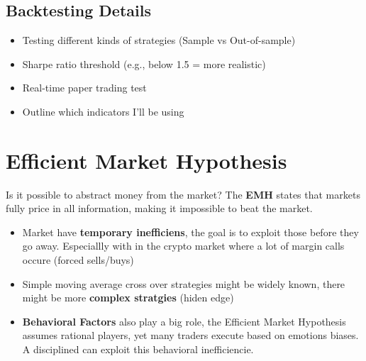 \documentclass[9pt,a4paper,twocolumn,twoside]{tau-class/tau}
\begin{document}
\subsection{Backtesting Details}
\begin{itemize}
  \item Testing different kinds of strategies (Sample vs Out-of-sample)
  \item Sharpe ratio threshold (e.g., below 1.5 = more realistic)
  \item Real-time paper trading test
  \item Outline which indicators I’ll be using
\end{itemize}

\section{Efficient Market Hypothesis}

Is it possible to abstract money from the market? The \textbf{EMH} states that markets fully price in all information, making it impossible to beat the market.

\begin{itemize}
    \item Market have \textbf{temporary inefficiens}, the goal is to exploit those before they go away. Especiallly with in the crypto market where a lot of margin calls occure (forced sells/buys)
    \item Simple moving average cross over strategies might be widely known, there might be more \textbf{complex stratgies} (hiden edge)
    \item \textbf{Behavioral Factors} also play a big role, the Efficient Market Hypothesis assumes rational players, yet many traders execute based on emotions biases. A disciplined can exploit this behavioral inefficiencie.
\end{itemize}





\end{document}
